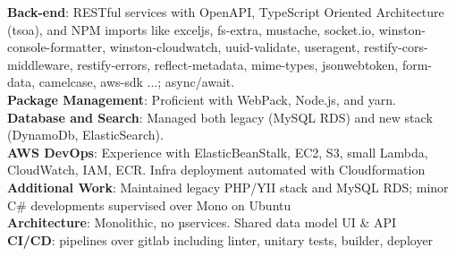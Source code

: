 \documentclass[
  a4paper,
   maincolor=cvblue,
   sectioncolor=cvblue,
]{fortysecondscv}
\begin{document}
\begin{cvtable}
{      \textbf{Back-end}: RESTful services with OpenAPI, TypeScript Oriented Architecture (tsoa), and NPM imports like exceljs, fs-extra, mustache, socket.io, winston-console-formatter, winston-cloudwatch, uuid-validate, useragent, restify-cors-middleware, restify-errors, reflect-metadata, mime-types, jsonwebtoken, form-data, camelcase, aws-sdk ...; async/await.\\
      \textbf{Package Management}: Proficient with WebPack, Node.js, and yarn.\\
      \textbf{Database and Search}: Managed both legacy (MySQL RDS) and new stack (DynamoDb, ElasticSearch).\\
      \textbf{AWS DevOps}: Experience with ElasticBeanStalk, EC2, S3, small Lambda, CloudWatch, IAM, ECR. Infra deployment automated with Cloudformation\\
      \textbf{Additional Work}: Maintained legacy PHP/YII stack and MySQL RDS; minor C\# developments supervised over Mono on Ubuntu\\
      \textbf{Architecture}: Monolithic, no µservices. Shared data model UI \& API\\
      \textbf{CI/CD}: pipelines over gitlab including linter, unitary tests, builder, deployer
    }
\end{cvtable}







\newpage
\makebacksidebar
\end{document}
